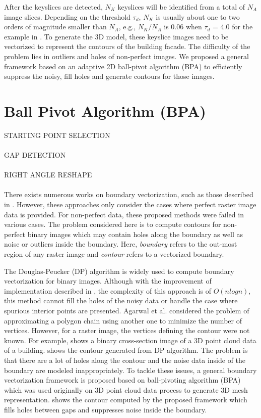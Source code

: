 
After the keyslices are detected, $N_K$ keyslices will be identified
from a total of $N_A$ image slices.
Depending on the threshold $\tau_{d}$, $N_K$ is usually about one to two
orders of magnitude smaller than $N_A$, e.g., $N_K/N_A$ is 0.06 when
$\tau_d$ = 4.0 for the example in .
To generate the 3D model, these keyslice images need to be vectorized to
represent the contours of the building facade.
The difficulty of the problem lies in outliers and holes of non-perfect images.
We proposed a general framework based on an adaptive 2D ball-pivot algorithm (BPA) 
 to efficiently suppress the noisy, fill holes and generate contours for those images.

\section{Ball Pivot Algorithm (BPA)}
\label{sec:BPA}

STARTING POINT SELECTION
\\
\\
GAP DETECTION
\\
\\
RIGHT ANGLE RESHAPE
\\
\\


There exists numerous works on boundary vectorization,
such as those described in \cite{DP_RP,DP_LC,DP_AAKMT}.
However, these approaches
only consider the cases where perfect raster image data is provided.
For non-perfect data, these proposed methods were failed in various cases.
The problem considered here is to compute contours
for non-perfect binary images which may contain holes
along the boundary as well as noise or outliers
inside the boundary. Here, {\it boundary} refers to the
out-most region of any raster image and
{\it contour} refers to a vectorized boundary.


The Douglas-Peucker (DP) algorithm \cite{DP_DP} is widely used
to compute boundary vectorization for binary images.
Although  with the improvement of implementation described in \cite{DP_HS, DP_HS94},
the complexity of this approach is of $O(nlogn)$, this method cannot fill the
holes of the noisy data or handle the case
where spurious interior points are presented.
Agarwal et al. \cite{DP_AV} considered the problem of
approximating a polygon chain using another one to minimize the number of
vertices. However, for a raster image, the vertices
defining the contour were not known.
For example,  shows a binary cross-section
image of a 3D point cloud data of a building.  shows
the contour generated from DP algorithm. The problem is that there are
a lot of holes along the contour and the noise data inside of the
boundary are modeled inappropriately.
To tackle these issues, a general boundary vectorization framework is proposed
based on ball-pivoting algorithm (BPA) \cite{BPA_BMRS} which was used
originally on 3D point cloud data process to generate 3D mesh representation.
 shows
the contour computed by the proposed framework which fills holes between gaps
and suppresses noise inside the boundary.


